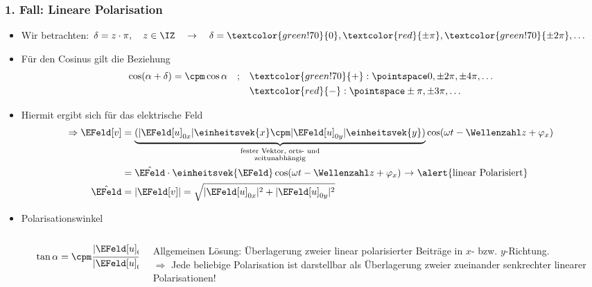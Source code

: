 \begin{frame}
  \frametitle{1. Fall: Lineare Polarisation}
  \begin{itemize}[<+->]
  \item Wir betrachten: \(\delta = z \cdot \pi ,\quad z \in \IZ\quad\rightarrow\quad \delta = \textcolor{green!70}{0}, \textcolor{red}{\pm \pi} , \textcolor{green!70}{\pm 2\pi}, \ldots\)
 \item Für den Cosinus gilt die Beziehung  
    \begin{align*}
\begin{split}
\cos ( \alpha + \delta ) = \cpm \cos \alpha \quad;\quad &\textcolor{green!70}{+} : \pointspace 0,\pm 2\pi, \pm 4\pi, \ldots\\
& \textcolor{red}{-} : \pointspace \pm \pi, \pm 3\pi, \ldots
\end{split}
\end{align*}
\item Hiermit ergibt sich für das elektrische Feld
\begin{align*}
  \Rightarrow \EFeld[v]&= \underbrace{(\vert \EFeld[u]_{0x} \vert \einheitsvek{x} \cpm \vert \EFeld[u]_{0y}\vert \einheitsvek{y})}_{\substack{\text{fester Vektor, orts- und}\\ \text{zeitunabhängig}}} \cos (\omega t - \Wellenzahl z + \varphi_x)\\
  &= \hat{\EFeld}\cdot \einheitsvek{\EFeld}\cos (\omega t - \Wellenzahl z + \varphi_x ) \text{ \(\to\) \alert{linear Polarisiert}}\\
  \hat{\EFeld} &= \vert \EFeld[v] \vert = \sqrt{\vert \EFeld[u]_{0x} \vert ^2 + \vert \EFeld[u]_{0y} \vert ^2}
\end{align*}
\item \alert{Polarisationswinkel}
  \begin{columns}
    \begin{column}{.2\linewidth}
      \hspace*{1cm}
      \end{column}
      \begin{column}{.2\linewidth}
        \(\tan \alpha = \cpm \dfrac{|\EFeld[u]_{0y}|}{|\EFeld[u]_{0x}|}\)
      \end{column}
      \begin{column}{.6\linewidth}
Allgemeinen Lösung: Überlagerung zweier linear polarisierter Beiträge in \(x\)- bzw. \(y\)-Richtung.\\
\(\Rightarrow\) \alert{Jede beliebige Polarisation ist darstellbar als Überlagerung zweier zueinander senkrechter linearer Polarisationen!}
\end{column}
    \end{columns}
  \end{itemize}
  \ 
\end{frame}

